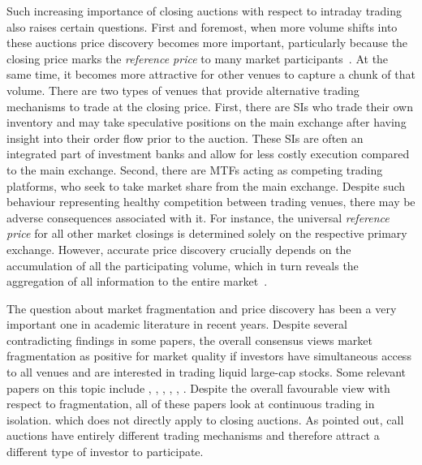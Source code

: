 \documentclass[11pt,a4paper]{article}
\begin{document}
    Such increasing importance of closing auctions with respect to intraday trading also raises certain questions. First and foremost, when more volume shifts into these auctions price discovery becomes more important, particularly because the closing price marks the \emph{reference price} to many market participants~\parencite{KandelRindiBosetti2012}. At the same time, it becomes more attractive for other venues to capture a chunk of that volume. There are two types of venues that provide alternative trading mechanisms to trade at the closing price. First, there are \acp{SI} who trade their own inventory and may take speculative positions on the main exchange after having insight into their order flow prior to the auction. These \acp{SI} are often an integrated part of investment banks and allow for less costly execution compared to the main exchange. Second, there are \acp{MTF} acting as competing trading platforms, who seek to take market share from the main exchange. Despite such behaviour representing healthy competition between trading venues, there may be adverse consequences associated with it. For instance, the universal \emph{reference price} for all other market closings is determined solely on the respective primary exchange. However, accurate price discovery crucially depends on the accumulation of all the participating volume, which in turn reveals the aggregation of all information to the entire market~\parencite{Madhavan1992}.

    The question about market fragmentation and price discovery has been a very important one in academic literature in recent years. Despite several contradicting findings in some papers, the overall consensus views market fragmentation as positive for market quality if investors have simultaneous access to all venues and are interested in trading liquid large-cap stocks. Some relevant papers on this topic include \textcite{GomberSagadeTheissenWeberWestheide2017}, \textcite{HaslagRinggenberg2016}, \textcite{PaganoPengSchwartz2013}, \textcite{AitkenChenFoley2017}, \textcite{DegryseDeJongVanKervel2015}, \textcite{OharaYe2011}. Despite the overall favourable view with respect to fragmentation, all of these papers look at continuous trading in isolation. which does not directly apply to closing auctions. As \textcite{Madhavan1992} pointed out, call auctions have entirely different trading mechanisms and therefore attract a different type of investor to participate.
\end{document}

